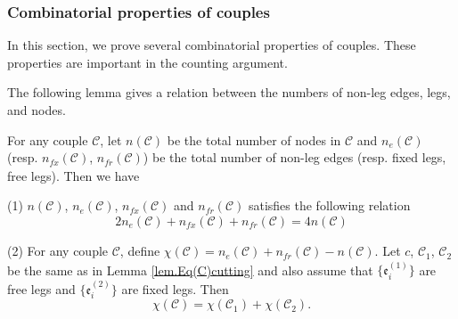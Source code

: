 \subsubsection{Combinatorial properties of couples} In this section, we prove several combinatorial properties of couples. These properties are important in the counting argument.

The following lemma gives a relation between the numbers of non-leg edges, legs, and nodes.

\begin{lem}\label{lem.eulerchar}
For any couple $\mathcal{C}$, let $n(\mathcal{C})$ be the total number of nodes in $\mathcal{C}$ and $n_e(\mathcal{C})$ (resp. $n_{fx}(\mathcal{C})$, $n_{\textit{fr}}(\mathcal{C})$) be the total number of non-leg edges (resp. fixed legs, free legs). Then we have

(1) $n(\mathcal{C})$, $n_e(\mathcal{C})$, $n_{fx}(\mathcal{C})$ and $n_{\textit{fr}}(\mathcal{C})$ satisfies the following relation
\begin{equation}\label{eq.nnenlnle}
 2n_e(\mathcal{C})+n_{fx}(\mathcal{C})+n_{\textit{fr}}(\mathcal{C})=4n(\mathcal{C})
\end{equation}

(2) For any couple $\mathcal{C}$, define $\chi(\mathcal{C})=n_e(\mathcal{C})+n_{\textit{fr}}(\mathcal{C})-n(\mathcal{C})$. Let $c$, $\mathcal{C}_1$, $\mathcal{C}_2$ be the same as in Lemma \ref{lem.Eq(C)cutting} and also assume that $\{\mathfrak{e}_{i}^{(1)}\}$ are free legs and $\{\mathfrak{e}_{i}^{(2)}\}$ are fixed legs. Then 
\begin{equation}
 \chi(\mathcal{C})=\chi(\mathcal{C}_1)+\chi(\mathcal{C}_2).
\end{equation}

\end{lem}

